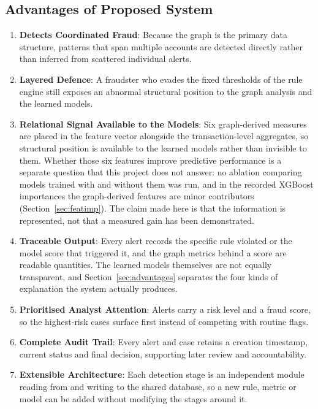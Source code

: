 \subsection{Advantages of Proposed System}
\begin{enumerate}
  \item \textbf{Detects Coordinated Fraud}: Because the graph is the primary data structure, patterns that span multiple accounts are detected directly rather than inferred from scattered individual alerts.
  \item \textbf{Layered Defence}: A fraudster who evades the fixed thresholds of the rule engine still exposes an abnormal structural position to the graph analysis and the learned models.
  \item \textbf{Relational Signal Available to the Models}: Six graph-derived measures are placed in the feature vector alongside the transaction-level aggregates, so structural position is available to the learned models rather than invisible to them. Whether those six features improve predictive performance is a separate question that this project does not answer: no ablation comparing models trained with and without them was run, and in the recorded XGBoost importances the graph-derived features are minor contributors (Section~\ref{sec:featimp}). The claim made here is that the information is represented, not that a measured gain has been demonstrated.
  \item \textbf{Traceable Output}: Every alert records the specific rule violated or the model score that triggered it, and the graph metrics behind a score are readable quantities. The learned models themselves are not equally transparent, and Section~\ref{sec:advantages} separates the four kinds of explanation the system actually produces.
  \item \textbf{Prioritised Analyst Attention}: Alerts carry a risk level and a fraud score, so the highest-risk cases surface first instead of competing with routine flags.
  \item \textbf{Complete Audit Trail}: Every alert and case retains a creation timestamp, current status and final decision, supporting later review and accountability.
  \item \textbf{Extensible Architecture}: Each detection stage is an independent module reading from and writing to the shared database, so a new rule, metric or model can be added without modifying the stages around it.
\end{enumerate}
